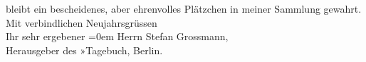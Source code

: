 \begin{ledgroupsized}[t]{13cm}
               bleibt ein bescheidenes, aber ehrenvolles Plätzchen in meiner Sammlung gewahrt.\pend
           \pstart
           Mit verbindlichen Neujahrsgrüssen{\\[\baselineskip]}Ihr sehr ergebener\pend
           \leftskip=0em{}{\bigskip}\pstart
           \noindent{}Herrn Stefan Grossmann,{\\}Herausgeber des »Tagebuch\label{T_L02459_1v}\label{T_L02459_1h}, Berlin.\pend
           
         
         \endnumbering{}\end{ledgroupsized}  \newcommand{\dateiname}{L02459}\newcommand{\titel}{Arthur Schnitzler an Stefan Großmann, 24. 12. 1925}\newcommand{\editorInnen}{Martin Anton Müller und Gerd-Hermann Susen}
      
